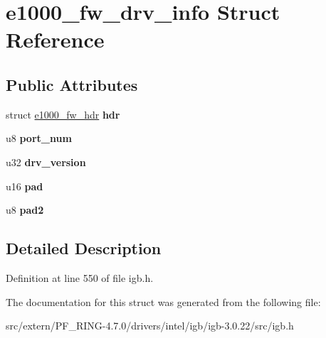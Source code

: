 \hypertarget{structe1000__fw__drv__info}{
\section{e1000\_\-fw\_\-drv\_\-info Struct Reference}
\label{structe1000__fw__drv__info}
}
\subsection*{Public Attributes}
\begin{DoxyCompactItemize}
\item 
\hypertarget{structe1000__fw__drv__info_a2b984ee1e29976ea2babc320d13c2691}{
struct \hyperlink{structe1000__fw__hdr}{e1000\_\-fw\_\-hdr} {\bfseries hdr}}
\label{structe1000__fw__drv__info_a2b984ee1e29976ea2babc320d13c2691}

\item 
\hypertarget{structe1000__fw__drv__info_a69c3ba04980bf2af5cf3bdac256b43ef}{
u8 {\bfseries port\_\-num}}
\label{structe1000__fw__drv__info_a69c3ba04980bf2af5cf3bdac256b43ef}

\item 
\hypertarget{structe1000__fw__drv__info_afa6641f390db8c36826df674e5a7890d}{
u32 {\bfseries drv\_\-version}}
\label{structe1000__fw__drv__info_afa6641f390db8c36826df674e5a7890d}

\item 
\hypertarget{structe1000__fw__drv__info_af5fafa89db8a6facdc396810fa459306}{
u16 {\bfseries pad}}
\label{structe1000__fw__drv__info_af5fafa89db8a6facdc396810fa459306}

\item 
\hypertarget{structe1000__fw__drv__info_a441f939139f7cc8b5b6f0408037c5f60}{
u8 {\bfseries pad2}}
\label{structe1000__fw__drv__info_a441f939139f7cc8b5b6f0408037c5f60}

\end{DoxyCompactItemize}


\subsection{Detailed Description}


Definition at line 550 of file igb.h.



The documentation for this struct was generated from the following file:\begin{DoxyCompactItemize}
\item 
src/extern/PF\_\-RING-\/4.7.0/drivers/intel/igb/igb-\/3.0.22/src/igb.h\end{DoxyCompactItemize}
